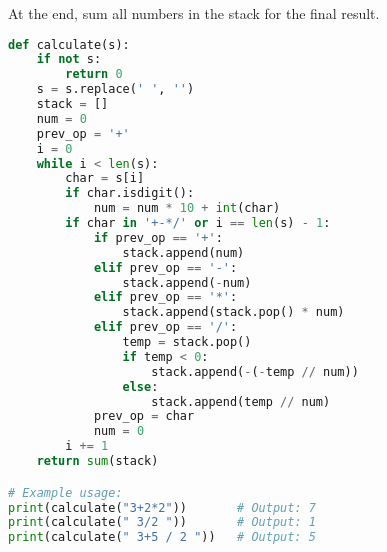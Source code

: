 At the end, sum all numbers in the stack for the final result.

\begin{lstlisting}[language=Python]
def calculate(s):
    if not s:
        return 0
    s = s.replace(' ', '')
    stack = []
    num = 0
    prev_op = '+'
    i = 0
    while i < len(s):
        char = s[i]
        if char.isdigit():
            num = num * 10 + int(char)
        if char in '+-*/' or i == len(s) - 1:
            if prev_op == '+':
                stack.append(num)
            elif prev_op == '-':
                stack.append(-num)
            elif prev_op == '*':
                stack.append(stack.pop() * num)
            elif prev_op == '/':
                temp = stack.pop()
                if temp < 0:
                    stack.append(-(-temp // num))
                else:
                    stack.append(temp // num)
            prev_op = char
            num = 0
        i += 1
    return sum(stack)

# Example usage:
print(calculate("3+2*2"))       # Output: 7
print(calculate(" 3/2 "))       # Output: 1
print(calculate(" 3+5 / 2 "))   # Output: 5
\end{lstlisting}